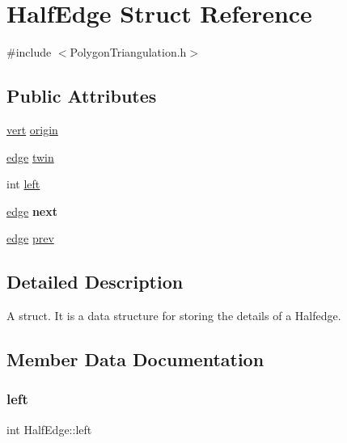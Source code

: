 \hypertarget{struct_half_edge}{}\section{Half\+Edge Struct Reference}
\label{struct_half_edge}


{\ttfamily \#include $<$Polygon\+Triangulation.\+h$>$}

\subsection*{Public Attributes}
\begin{DoxyCompactItemize}
\item 
\hyperlink{_polygon_triangulation_8h_a15bccd83c1e570e4a0ff17c42152989b}{vert} \hyperlink{struct_half_edge_a94238a660669b2937f9e1347b4c17b85}{origin}
\item 
\hyperlink{_polygon_triangulation_8h_a4ef43ff5c6d42dacbc8ffd9c8cfdc189}{edge} \hyperlink{struct_half_edge_a7480da05d333a051d4156584981bed78}{twin}
\item 
int \hyperlink{struct_half_edge_aeb3f40cd4292ff4429911ab14043d05d}{left}
\item 
\mbox{\label{struct_half_edge_a8ce3ac9de18dcfe132177c071c84e577}} 
\hyperlink{_polygon_triangulation_8h_a4ef43ff5c6d42dacbc8ffd9c8cfdc189}{edge} {\bfseries next}
\item 
\hyperlink{_polygon_triangulation_8h_a4ef43ff5c6d42dacbc8ffd9c8cfdc189}{edge} \hyperlink{struct_half_edge_a6c8df0be25a4c700e1565fd9fa371b52}{prev}
\end{DoxyCompactItemize}


\subsection{Detailed Description}
A struct. It is a data structure for storing the details of a Halfedge. 

\subsection{Member Data Documentation}
\mbox{\label{struct_half_edge_aeb3f40cd4292ff4429911ab14043d05d}} 
\subsubsection{\texorpdfstring{left}{left}}
{\footnotesize\ttfamily int Half\+Edge\+::left}

